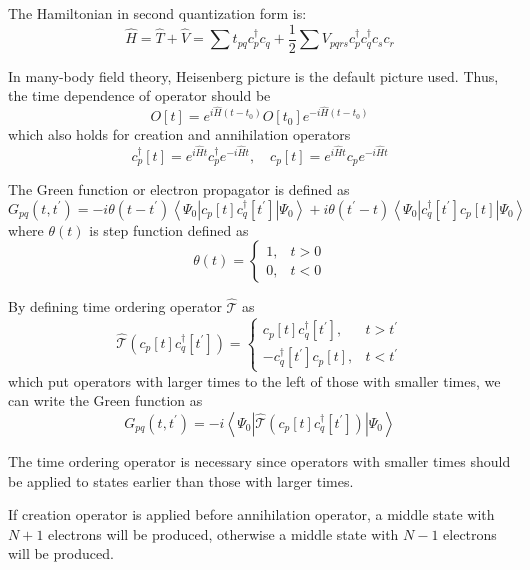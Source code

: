 \documentclass[bachelor, english]{ustcthesis}
\begin{document}
The Hamiltonian in second quantization form is:
$$
\hat{H}=\hat{T}+\hat{V}=\sum t_{p q} c_{p}^{\dagger} c_{q}+\frac{1}{2} \sum V_{p q r s} c_{p}^{\dagger} c_{q}^{\dagger} c_{s} c_{r}
$$

In many-body field theory, Heisenberg picture is the default picture used.
Thus, the time dependence of operator should be
$$
O[t]=e^{i \hat{H} (t-t_0)} O[t_0] e^{-i \hat{H} (t-t_0)}
$$
which also holds for creation and annihilation operators
$$
c_{p}^{\dagger}[t]=e^{i \hat{H} t} c_{p}^{\dagger} e^{-i \hat{H} t}, \quad c_{p}[t]=e^{i \hat{H} t} c_{p} e^{-i \hat{H} t}
$$

The Green function or electron propagator is defined as
\begin{equation} \label{eq:greendef}
G_{p q}\left(t, t^{\prime}\right)=-i \theta\left(t-t^{\prime}\right)\left\langle\Psi_{0}\left|c_{p}[t] c_{q}^{\dagger}\left[t^{\prime}\right]\right| \Psi_{0}\right\rangle+ i \theta\left(t^{\prime}-t\right)\left\langle\Psi_{0}\left|c_{q}^{\dagger}\left[t^{\prime}\right] c_{p}[t]\right| \Psi_{0}\right\rangle
\end{equation}
where $\theta(t)$ is step function defined as
$$
\theta(t)=\left\{\begin{array}{ll}{1,} & {t>0} \\ {0,} & {t<0}\end{array}\right.
$$

By defining time ordering operator $\hat{\mathcal{T}}$ as
$$
\hat{\mathcal{T}}\left(c_{p}[t] c_{q}^{\dagger}\left[t^{\prime}\right]\right)=\left\{\begin{array}{cc}{c_{p}[t] c_{q}^{\dagger}\left[t^{\prime}\right],} & {t>t^{\prime}} \\ {-c_{q}^{\dagger}\left[t^{\prime}\right] c_{p}[t],} & {t<t^{\prime}}\end{array}\right.
$$
which put operators with larger times to the left of those with smaller times,
we can write the Green function as
$$
G_{p q}\left(t, t^{\prime}\right)=-i\left\langle\Psi_{0}\left|\hat{\mathcal{T}}\left(c_{p}[t] c_{q}^{\dagger}\left[t^{\prime}\right]\right)\right| \Psi_{0}\right\rangle
$$

The time ordering operator is necessary since operators with smaller times should be applied to states earlier than those with larger times.

If creation operator is applied before annihilation operator, a middle state with $N+1$ electrons will be produced, otherwise a middle state with $N-1$ electrons will be produced.
\end{document}
